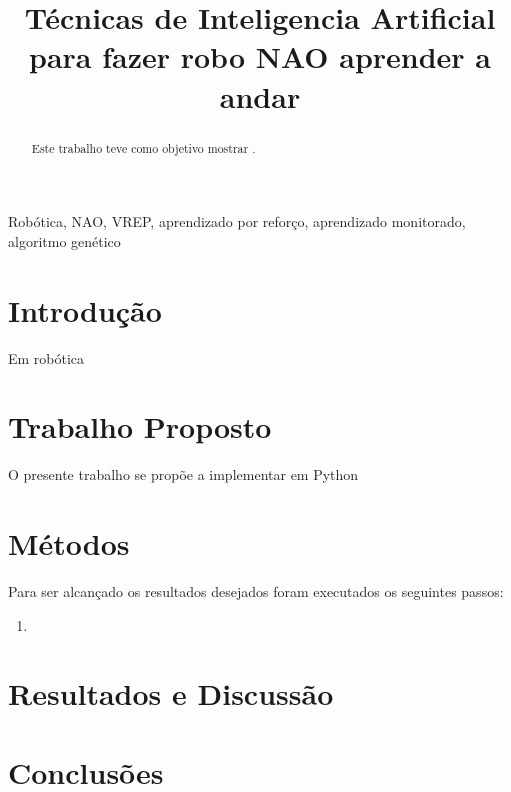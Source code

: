 \documentclass[twoside,conference,a4paper]{IEEEtran}
\begin{document}
\renewcommand{\IEEEkeywordsname}{Palavras-chave}


\title{Técnicas de Inteligencia Artificial para fazer robo NAO aprender a andar}
\author{%
}


\maketitle

\begin{abstract}
Este trabalho teve como objetivo mostrar .
\end{abstract}

\begin{IEEEkeywords}
 Robótica, NAO, VREP, aprendizado por reforço, aprendizado monitorado, algoritmo genético
\end{IEEEkeywords}


\section{Introdução}

Em robótica
\section{Trabalho Proposto}

O presente trabalho se propõe a implementar em Python
\section{Métodos}

Para ser alcançado os resultados desejados foram executados os seguintes passos:
\begin{enumerate}
 \item
\end{enumerate}


\section{Resultados e Discussão}

\section{Conclusões}

\nocite{Aula}



\end{document}
